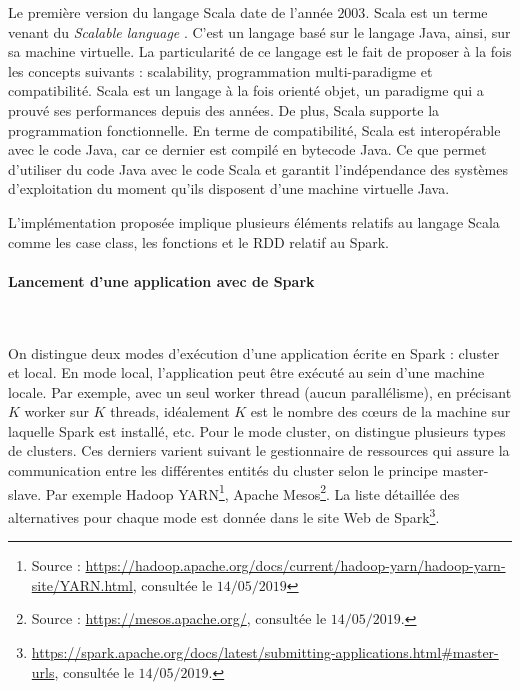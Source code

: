 
Le première version du langage Scala date de l'année $2003$. Scala  est un terme venant du \textit{ Scalable language }. C'est un langage basé sur le langage Java, ainsi, sur sa machine virtuelle. La particularité de ce langage est le fait de proposer à la fois les concepts suivants : scalability, programmation multi-paradigme et compatibilité.  
Scala est un langage à la fois orienté objet, un paradigme qui a prouvé ses performances depuis des années. De plus, Scala supporte la programmation fonctionnelle. En terme de compatibilité, Scala est interopérable avec le code Java, car ce dernier est compilé en bytecode Java. Ce que permet d'utiliser du code Java avec le code Scala et garantit l'indépendance des systèmes d'exploitation du moment qu'ils disposent d'une machine virtuelle Java.

L'implémentation proposée implique plusieurs éléments relatifs au langage Scala comme les case class, les fonctions et le RDD relatif au Spark. 

\paragraph{Lancement d'une application avec de Spark} \label{spark-master-modes}~

On distingue deux modes d'exécution d'une application écrite en Spark : cluster et local. En  mode local, l'application  peut être exécuté au sein d'une machine locale. Par exemple,  avec un seul worker thread (aucun parallélisme),  en précisant $K$ worker sur $K$ threads, idéalement $K$ est le nombre des  c\oe{}urs de la machine sur laquelle Spark est installé, etc. 
 Pour le mode cluster, on distingue plusieurs types de clusters. Ces derniers  varient suivant le gestionnaire de ressources qui assure la communication entre les différentes entités du cluster selon le principe master-slave. Par exemple Hadoop YARN\footnote{Source : \url{https://hadoop.apache.org/docs/current/hadoop-yarn/hadoop-yarn-site/YARN.html}, consultée  le $14/05/2019$ }, Apache Mesos\footnote{Source : \url{https://mesos.apache.org/}, consultée le $14/05/2019$.}. La liste détaillée des alternatives pour chaque mode est donnée dans le site Web de Spark\footnote{\url{https://spark.apache.org/docs/latest/submitting-applications.html\#master-urls}, consultée le $14/05/2019$.}. 
 
